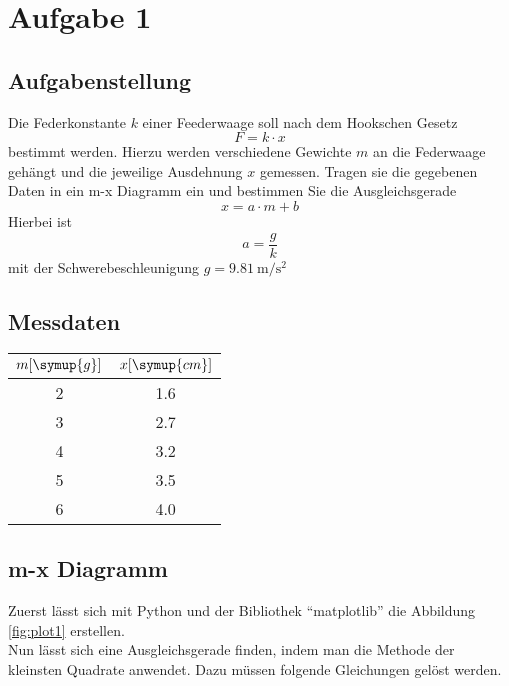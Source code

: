 \section{Aufgabe 1}
\subsection{Aufgabenstellung}
Die Federkonstante $k$ einer Feederwaage soll nach dem Hookschen Gesetz
\begin{equation}
F = k \cdot x
\label{eqn:hookeq}
\end{equation}
bestimmt werden. Hierzu werden verschiedene Gewichte $m$ an die Federwaage gehängt und die jeweilige Ausdehnung $x$ 
gemessen. Tragen sie die gegebenen Daten in ein m-x Diagramm ein und bestimmen Sie die Ausgleichsgerade
\begin{equation}
x = a \cdot m + b
\label{eqn:ausglgeradetheorie}
\end{equation}
Hierbei ist
\begin{equation}
a = \frac{g}{k}
\label{eqn:beschl}
\end{equation}
mit der Schwerebeschleunigung $g = \SI{9.81}{\meter\per\second\squared}$

\subsection{Messdaten}
\begin{table}
\centering
\label{tab:gemDaten}
\begin{tabular}{c c}
    $m [\symup{g}]$ & $x [\symup{cm}]$ \\
    \midrule
    2 & 1.6 \\
    3 & 2.7 \\
    4 & 3.2 \\
    5 & 3.5 \\
    6 & 4.0 \\
    \bottomrule
\end{tabular}
\end{table}

\subsection{m-x Diagramm}
\begin{flushleft}
Zuerst lässt sich mit Python und der Bibliothek \enquote{matplotlib} die Abbildung \ref{fig:plot1} erstellen.\\
Nun lässt sich eine Ausgleichsgerade finden, indem man die Methode der kleinsten Quadrate anwendet. Dazu müssen folgende Gleichungen gelöst werden.
\end{flushleft}

